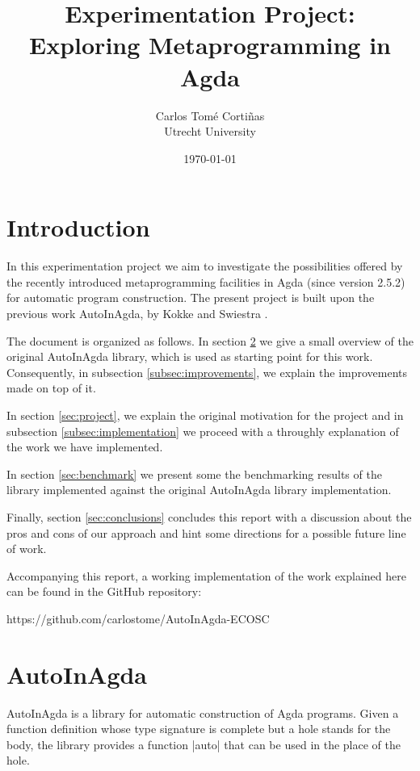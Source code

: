 \documentclass[a4paper]{article}
\author{Carlos Tom\'e Corti\~nas \\ Utrecht University}
\title{Experimentation Project: Exploring Metaprogramming in Agda}
\date{\today}
\begin{document}
\maketitle

\section{Introduction}

In this experimentation project we aim to investigate the possibilities offered
by the recently introduced metaprogramming facilities in Agda (since version
2.5.2) for automatic program construction. The present project is built upon the
previous work AutoInAgda, by Kokke and Swiestra \cite{Kokke2015}.

The document is organized as follows. In section \ref{sec:AutoInAgda} we give a
small overview of the original AutoInAgda library, which is used as starting
point for this work. Consequently, in subsection \ref{subsec:improvements}, we
explain the improvements made on top of it.

In section \ref{sec:project}, we explain the original motivation for the project
and in subsection \ref{subsec:implementation} we proceed with a throughly
explanation of the work we have implemented.

In section \ref{sec:benchmark} we present some the benchmarking results of the
library implemented against the original AutoInAgda library implementation.

Finally, section \ref{sec:conclusions} concludes this report with a discussion
about the pros and cons of our approach and hint some directions for a possible
future line of work.

Accompanying this report, a working implementation of the work explained here
can be found in the GitHub repository:

\begin{center}
{https://github.com/carlostome/AutoInAgda-ECOSC}
\end{center}

\section{AutoInAgda}
\label{sec:AutoInAgda}

AutoInAgda is a library for automatic construction of Agda programs. Given a
function definition whose type signature is complete but a hole stands for the
body, the library provides a function |auto| that can be used in the place of
the hole.
\end{document}
